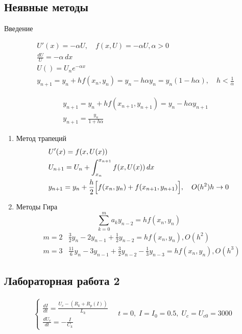 \subsection{Неявные методы}

Введение

\begin{align*}
&U'(x) = -\alpha U, \quad f(x, U) = -\alpha U, \alpha > 0
\\
&\frac{dU}{U} = -\alpha\, dx
\\
&U() = U_n e^{-\alpha x}
\\
&y_{n+1} = y_n + hf(x_n, y_n) = y_n - h\alpha y_n = y_n(1 - h\alpha), \quad h < \frac{1}{\alpha}
\end{align*}

\begin{align*}
	&y_{n+1} = y_n + h f(x_{n+1}, y_{n+1}) = y_n - h\alpha y_{n+1}
	\\
	&y_{n+1} = \frac{y_n}{1 + h\alpha}
\end{align*}

\begin{enumerate}
	\item Метод трапеций
	\begin{align*}
	&U'(x) =  f(x, U(x))
	\\
	&U_{n+1} = U_{n} + \int_{x_{n}}^{x_{n+1}} f(x, U(x))\, dx
	\\
	&y_{n+1} = y_n + \frac{h}{2}\Bigl[f(x_n, y_n) + f(x_{n+1}, y_{n+1})\Bigr], \quad O(h^2) h \to 0
	\end{align*}
	\item Методы Гира
	\[
		\sum_{k = 0}^{m} a_k y_{n-2} = h f(x_n, y_n)
	\]
	\begin{align*}
			&m = 2 &\frac{3}{2} y_n - 2 y_{n-1} + \frac{1}{2} y_{n-2} = h f(x_n, y_n), O(h^2)
			\\
			&m = 3 &\frac{11}{6} y_n - 3 y_{n-1} + \frac{3}{2} y_{n-2} - \frac{1}{3} y_{n-3} = h f(x_n, y_n), O(h^3)
	\end{align*}
\end{enumerate}

\subsection{Лабораторная работа 2}

\begin{align*}
	\begin{cases*}
		\frac{dI}{dt} = \frac{U_c - (R_k + R_p(I))}{L_k}\\
		\frac{dU_c}{dt} = - \frac{I}{C_k}
	\end{cases*}
	\quad t = 0,\; I = I_0 = 0.5,\; U_c = U_{c0} = 3000
\end{align*}

